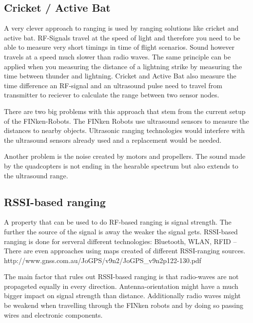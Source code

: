 \subsection{Cricket / Active Bat}
A very clever approach to ranging is used by ranging solutions like cricket\cite{cricket_01} and active bat. 
RF-Signals travel at the speed of light and therefore you need to be able to measure very short timings in time of flight scenarios.
Sound however travels at a speed much slower than radio waves.
The same principle can be applied when you measuring the distance of a lightning strike by measuring the time between thunder and lightning.
Cricket and Active Bat also measure the time difference an RF-signal and an ultrasound pulse need to travel from transmitter to reciever to calculate the range between two sensor nodes.



There are two big problems with this approach that stem from the current setup of the FINken-Robots.
The FINken Robots use ultrasound sensors to measure the distances to nearby objects.
Ultrasonic ranging technologies would interfere with the ultrasound sensors already used and a replacement would be needed.

Another problem is the noise created by motors and propellers.
The sound made by the quadcopters is not ending in the hearable spectrum but also extends to the ultrasound range.

\subsection{RSSI-based ranging}

A property that can be used to do RF-based ranging is signal strength.
The further the source of the signal is away the weaker the signal gets.
RSSI-based ranging is done for serveral different technologies: Bluetooth, WLAN, RFID –
There are even approaches using maps created of different RSSI-ranging sources. http://www.gnss.com.au/JoGPS/v9n2/JoGPS\_v9n2p122-130.pdf 

The main factor that rules out RSSI-based ranging is that radio-waves are not propageted equally in every direction. 
Antenna-orientation might have a much bigger impact on signal strength than distance.
Additionally radio waves might be weakend when travelling through the FINken robots and by doing so passing wires and electronic components.

